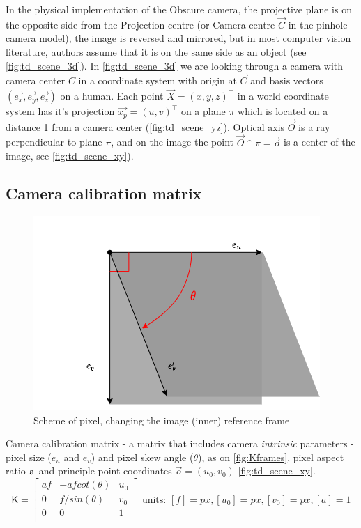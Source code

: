 In the physical implementation of the Obscure camera, the projective plane is on the opposite side from the Projection centre (or Camera centre $\vec{C}$ in the pinhole camera model), the image is reversed and mirrored, but in most computer vision literature, authors assume that it is on the same side as an object (see \autoref{fig:td_scene_3d}).
In \autoref{fig:td_scene_3d} we are looking through a camera with camera center $C$ in a coordinate system with origin at $\vec{C}$ and basis vectors $(\vec{e_x}, \vec{e_y}, \vec{e_z})$ on a human. 
Each point $\vec{X} = (x, y, z)^\top$ in a world coordinate system has it's projection $\vec{x_p} = (u, v)^\top$ on a plane $\pi$ which is located on a distance 1 from a camera center (\autoref{fig:td_scene_yz}). 
Optical axis $\vec{O}$ is a ray perpendicular to plane $\pi$, and on the image the point $ \vec{O} \cap \pi = \vec{o}$ is a center of the image, see \autoref{fig:td_scene_xy}).

\subsection{Camera calibration matrix}
\begin{figure}[h]
    \centering
    \includegraphics[width=.6\textwidth]{graphics/pixel.png}
    \caption{Scheme of pixel, changing the image (inner) reference frame}
    \label{fig:Kframes}
\end{figure}
Camera calibration matrix - a matrix that includes camera \textit{intrinsic} parameters - pixel size ($e_u$ and $e_v$) and pixel skew angle ($\theta$), as on \autoref{fig:Kframes}, pixel aspect ratio $\bf{a}$ and principle point coordinates $\vec{o} = (u_0, v_0)$ \autoref{fig:td_scene_xy}.
\begin{equation}
    \pmb{\mathsf{K}} = \begin{bmatrix}
        af & -a f cot(\theta) & u_0 \\
        0 & f / sin(\theta) & v_0 \\
        0 & 0 & 1 \\
    \end{bmatrix} 
    \textrm{ units: } [f]=px, [u_0]=px, [v_0]=px, [a]=1
\end{equation}


